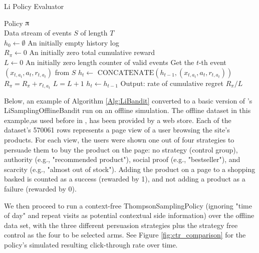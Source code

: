 \documentclass{jss}
\begin{document}
\begin{algorithm}[H]
\caption{Li Policy Evaluator}
\label{Alg:LiBandit}
\begin{algorithmic}
\REQUIRE  Policy $\piup$ \\
                 Data stream of events $S$ of length $T$  \\
                 $h_0 \leftarrow \emptyset$ {An initially empty history log}\\
                 $R_\pi \leftarrow 0$ {An initially zero total cumulative reward}\\
                 $L \leftarrow 0$ {An initially zero length counter of valid events}
	\STATE Get the $t$-th event \( (x_{t,a_t},a_{t},r_{t,a_t}) \) from  $S$
	       \STATE $h_{t} \leftarrow $  \(\textrm{CONCATENATE}\left( h_{t-1},(x_{t,a_t},a_{t},r_{t,a_t})  \right)\)
	       \STATE $R_\pi = R_\pi + r_{t,a_t}$
	       \STATE $L = L + 1$
	\ELSE
	        \STATE $h_{t} \leftarrow  h_{t-1} $
	\ENDIF
\ENDFOR
\STATE Output: rate of cumulative regret $R_\pi / L $
\end{algorithmic}
\end{algorithm}

Below, an example of Algorithm \ref{Alg:LiBandit} converted to a basic version of 's  LiSamplingOfflineBandit run on an offline simulation. The offline dataset in this example,as used before in \cite{Kaptein2018}, has been provided by a web store. Each of the dataset's 570061 rows represents a page view of a user browsing the site's products. For each view, the users were shown one out of four strategies to persuade them to buy the product on the page: no strategy (control group), authority (e.g., "recommended product"), social proof (e.g., "bestseller"), and scarcity (e.g., "almost out of stock"). Adding the product on a page to a shopping basked is counted as a success (rewarded by 1), and not adding a product as a failure (rewarded by 0).

We then proceed to run a context-free ThompsonSamplingPolicy (ignoring "time of day" and repeat visits as potential contextual side information) over the offline data set, with the three different persuasion strategies plus the strategy free control as the four to be selected arms. See Figure \ref{fig:ctr_comparison} for the policy's simulated resulting click-through rate over time.
\end{document}
